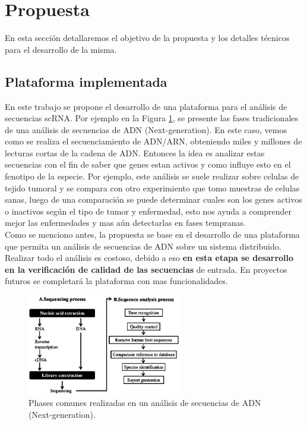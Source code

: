 \section{Propuesta}

En esta sección detallaremos el objetivo de la propuesta y los detalles técnicos para el desarrollo de la misma.

\subsection{Plataforma implementada}

En este trabajo se propone el desarrollo de una plataforma para el análisis de secuencias scRNA.  Por ejemplo en la Figura \ref{fig:analysis}, se presente las fases tradicionales de una análisis de secuencias de ADN (Next-generation). En este caso, vemos como se realiza el secuenciamiento de ADN/ARN, obteniendo miles y millones de lecturas cortas de la cadena de ADN. Entonces la idea es analizar estas secuencias con el fin de  saber que genes estan activos y como influye esto en el fenotipo de la especie. Por ejemplo, este análisis se suele realizar sobre celulas de tejido tumoral y se compara con otro experimiento que tomo muestras de celulas sanas, luego de una comparación se puede determinar cuales son los genes activos o inactivos según el tipo de tumor y enfermedad, esto nos ayuda a comprender mejor las enfermedades y mas aún detectarlas en fases tempranas. \\

Como se menciono antes, la propuesta se base en el desarrollo de una plataforma que permita un análisis de secuencias de ADN sobre un sistema distribuido. Realizar todo el análisis es costoso, debido a eso \textbf{en esta etapa se desarrollo en la verificación de calidad de las secuencias} de entrada. En proyectos futuros se completará la plataforma con mas funcionalidades. \\

\begin{figure}[H]
    \centering
    \includegraphics[width=0.6\textwidth]{img/proy/analysis2}
    \caption{Phases comunes realizadas en un análisis de secuencias de ADN (Next-generation).}
    \label{fig:analysis}
\end{figure}

